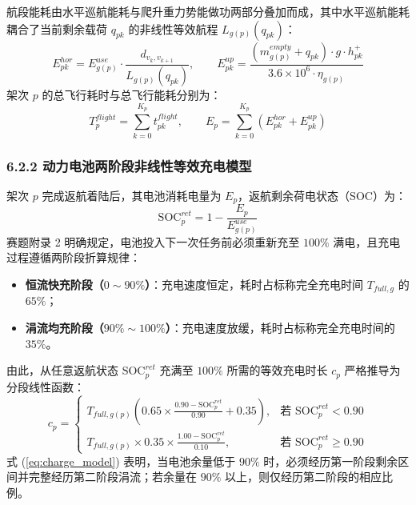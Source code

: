 \documentclass[withoutpreface,bwprint]{format}
\begin{document}
航段能耗由水平巡航能耗与爬升重力势能做功两部分叠加而成，其中水平巡航能耗耦合了当前剩余载荷 $q_{pk}$ 的非线性等效航程 $L_{g(p)}(q_{pk})$：
\begin{equation}
E_{pk}^{hor} = E_{g(p)}^{use} \cdot \frac{d_{v_k, v_{k+1}}}{L_{g(p)}(q_{pk})}, \qquad E_{pk}^{up} = \frac{(m_{g(p)}^{empty} + q_{pk}) \cdot g \cdot h_{pk}^+}{3.6 \times 10^6 \cdot \eta_{g(p)}}
\end{equation}
架次 $p$ 的总飞行耗时与总飞行能耗分别为：
\begin{equation}
T_p^{flight} = \sum_{k=0}^{K_p} t_{pk}^{flight}, \qquad E_p = \sum_{k=0}^{K_p} \left( E_{pk}^{hor} + E_{pk}^{up} \right)
\end{equation}

\subsubsection{6.2.2 动力电池两阶段非线性等效充电模型}
架次 $p$ 完成返航着陆后，其电池消耗电量为 $E_p$，返航剩余荷电状态（SOC）为：
\begin{equation}
\text{SOC}_p^{ret} = 1 - \frac{E_p}{E_{g(p)}^{use}}
\end{equation}
赛题附录 2 明确规定，电池投入下一次任务前必须重新充至 $100\%$ 满电，且充电过程遵循两阶段折算规律：
\begin{itemize}[leftmargin=*]
    \item \textbf{恒流快充阶段（$0 \sim 90\%$）}：充电速度恒定，耗时占标称完全充电时间 $T_{full, g}$ 的 $65\%$；
    \item \textbf{涓流均充阶段（$90\% \sim 100\%$）}：充电速度放缓，耗时占标称完全充电时间的 $35\%$。
\end{itemize}
由此，从任意返航状态 $\text{SOC}_p^{ret}$ 充满至 $100\%$ 所需的等效充电时长 $c_p$ 严格推导为分段线性函数：
\begin{equation}
c_p = \begin{cases}
T_{full, g(p)} \left( 0.65 \times \frac{0.90 - \text{SOC}_p^{ret}}{0.90} + 0.35 \right), & \text{若 } \text{SOC}_p^{ret} < 0.90 \\
T_{full, g(p)} \times 0.35 \times \frac{1.00 - \text{SOC}_p^{ret}}{0.10}, & \text{若 } \text{SOC}_p^{ret} \ge 0.90
\end{cases}
\label{eq:charge_model}
\end{equation}
式 (\ref{eq:charge_model}) 表明，当电池余量低于 $90\%$ 时，必须经历第一阶段剩余区间并完整经历第二阶段涓流；若余量在 $90\%$ 以上，则仅经历第二阶段的相应比例。
\end{document}
